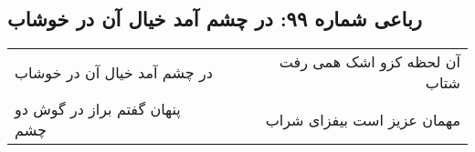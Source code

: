 \begin{center}
\section*{رباعی شماره ۹۹: در چشم آمد خیال آن در خوشاب}
\label{sec:0099}
\begin{longtable}{l p{0.5cm} r}
در چشم آمد خیال آن در خوشاب
&&
آن لحظه کزو اشک همی رفت شتاب
\\
پنهان گفتم براز در گوش دو چشم
&&
مهمان عزیز است بیفزای شراب
\\
\end{longtable}
\end{center}
